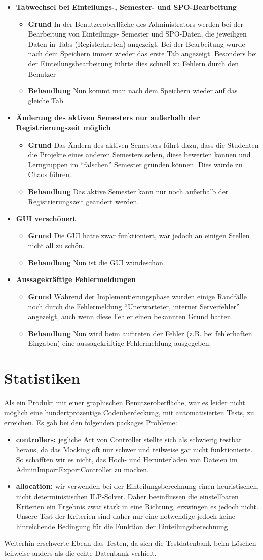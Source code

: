 \documentclass[parskip=full]{scrartcl}
\newcommand{\verbesserung}[3]{\textbf{#1}
 							\begin{itemize}
 							  
 							  \item \textbf{Grund} #2
 							  \item \textbf{Behandlung} #3
 							\end{itemize}}
\newcommand{\code}[1]{{\ttfamily #1}}
\begin{document}
\begin{itemize}
\item \verbesserung{Tabwechsel bei Einteilungs-, Semester- und
SPO-Bearbeitung}{In der Benutzeroberfläche des Administrators werden bei der
Bearbeitung von Einteilungs- Semester und SPO-Daten, die jeweiligen Daten in
Tabs (Registerkarten) angezeigt. Bei der Bearbeitung wurde nach dem Speichern
immer wieder das erste Tab angezeigt. Besonders bei der
Einteilungsbearbeitung führte dies schnell zu Fehlern durch den Benutzer}{Nun
kommt man nach dem Speichern wieder auf das gleiche Tab}
\item \verbesserung{Änderung des aktiven Semesters nur außerhalb der
Registrierungszeit möglich}{Das Ändern des aktiven Semesters führt dazu, dass
die Studenten die Projekte eines anderen Semesters sehen, diese bewerten
können und Lerngruppen im \enquote{falschen} Semester gründen können. Dies
würde zu Chaos führen.}{Das aktive Semester kann nur noch außerhalb der
Registrierungszeit geändert werden.}
\item \verbesserung{GUI verschönert}{Die GUI hatte zwar funktioniert, war
jedoch an einigen Stellen nicht all zu schön.}{Nun ist die GUI wundeschön.}%
\item \verbesserung{Aussagekräftige Fehlermeldungen}{Während der
Implementierungsphase wurden einige Randfälle noch durch die Fehlermeldung
\enquote{Unerwarteter, interner Serverfehler} angezeigt, auch wenn diese
Fehler einen bekannten Grund hatten.}{Nun wird beim auftreten der Fehler (z.B.
bei fehlerhaften Eingaben) eine aussagekräftige Fehlermeldung ausgegeben. }
\end{itemize}
\section{Statistiken}
Als ein Produkt mit einer graphischen Benutzeroberfläche, war es leider nicht
möglich eine hundertprozentige Codeüberdeckung, mit automatisierten Tests, zu
erreichen. Es gab bei den folgenden \code{packages} Probleme:
\begin{itemize}
  \item \textbf{\code{controllers:}} jegliche Art von Controller stellte sich
  als schwierig testbar heraus, da das Mocking oft nur schwer und teilweise gar
  nicht funktionierte. So schafften wir es nicht, das Hoch- und Herunterladen von
  Dateien im \code{AdminImportExportController} zu mocken.
  \item \textbf{\code{allocation:}} wir verwenden bei der Einteilungsberechnung
  einen heuristischen, nicht deterministischen ILP-Solver. Daher beeinflussen
  die einstellbaren Kriterien ein Ergebnis zwar stark in eine Richtung,
  erzwingen es jedoch nicht. Unsere Test der Kriterien sind daher nur eine
  notwendige jedoch keine hinreichende Bedingung für die Funktion der
  Einteilungsberechnung. 
\end{itemize}
Weiterhin erschwerte Ebean das Testen, da sich die Testdatenbank beim Löschen
teilweise anders als die echte Datenbank verhielt. 
\end{document}
